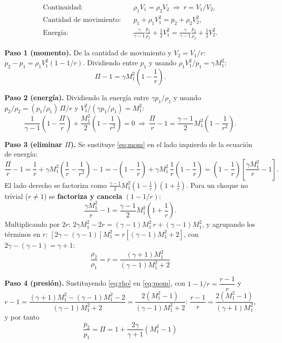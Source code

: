 \documentclass[11pt,a4paper]{article}
\begin{document}
\begin{align}
\text{Continuidad:}&\quad \rho_1V_1=\rho_2V_2\ \Rightarrow\ r=V_1/V_2,\\
\text{Cantidad de movimiento:}&\quad p_1+\rho_1V_1^2=p_2+\rho_2V_2^2,\\
\text{Energía:}&\quad \tfrac{\gamma}{\gamma-1}\tfrac{p_1}{\rho_1}+\tfrac12V_1^2=\tfrac{\gamma}{\gamma-1}\tfrac{p_2}{\rho_2}+\tfrac12V_2^2.
\end{align}

\textbf{Paso 1 (momento).} De la cantidad de movimiento y $V_2=V_1/r$: $p_2-p_1=\rho_1V_1^2(1-1/r)$. Dividiendo entre $p_1$ y usando $\rho_1V_1^2/p_1=\gamma M_1^2$:
\begin{equation}\Pi-1=\gamma M_1^2\left(1-\frac1r\right).\label{eq:mom}\end{equation}

\textbf{Paso 2 (energía).} Dividiendo la energía entre $\gamma p_1/\rho_1$ y usando $p_2/\rho_2=(p_1/\rho_1)\,\Pi/r$ y $V_1^2/(\gamma p_1/\rho_1)=M_1^2$:
\[
\frac{1}{\gamma-1}\left(1-\frac{\Pi}{r}\right)+\frac{M_1^2}{2}\left(1-\frac1{r^2}\right)=0
\ \Longrightarrow\
\frac{\Pi}{r}-1=\frac{\gamma-1}{2}M_1^2\left(1-\frac1{r^2}\right).\label{eq:en}
\]

\textbf{Paso 3 (eliminar $\Pi$).} Se sustituye \eqref{eq:mom} en el lado izquierdo de la ecuación de energía:
\[
\frac{\Pi}{r}-1=\frac1r+\gamma M_1^2\left(\frac1r-\frac1{r^2}\right)-1=-\left(1-\frac1r\right)+\gamma M_1^2\,\frac1r\left(1-\frac1r\right)
=\left(1-\frac1r\right)\left[\frac{\gamma M_1^2}{r}-1\right].
\]
El lado derecho se factoriza como $\tfrac{\gamma-1}{2}M_1^2\left(1-\tfrac1r\right)\left(1+\tfrac1r\right)$. Para un choque no trivial ($r\ne1$) se
\textbf{factoriza y cancela} $(1-1/r)$:
\[
\frac{\gamma M_1^2}{r}-1=\frac{\gamma-1}{2}M_1^2\left(1+\frac1r\right).
\]
Multiplicando por $2r$: $2\gamma M_1^2-2r=(\gamma-1)M_1^2\,r+(\gamma-1)M_1^2$, y agrupando los términos en $r$:
$\left[2\gamma-(\gamma-1)\right]M_1^2=r\left[(\gamma-1)M_1^2+2\right]$, con $2\gamma-(\gamma-1)=\gamma+1$:
\begin{equation}
\boxed{\frac{\rho_2}{\rho_1}=r=\frac{(\gamma+1)M_1^2}{(\gamma-1)M_1^2+2}}\label{eq:rho}
\end{equation}

\textbf{Paso 4 (presión).} Sustituyendo \eqref{eq:rho} en \eqref{eq:mom}, con $1-1/r=\dfrac{r-1}{r}$ y
$r-1=\dfrac{(\gamma+1)M_1^2-(\gamma-1)M_1^2-2}{(\gamma-1)M_1^2+2}=\dfrac{2(M_1^2-1)}{(\gamma-1)M_1^2+2}$:
$\dfrac{r-1}{r}=\dfrac{2(M_1^2-1)}{(\gamma+1)M_1^2}$, y por tanto
\begin{equation}
\boxed{\frac{p_2}{p_1}=\Pi=1+\frac{2\gamma}{\gamma+1}\left(M_1^2-1\right)}\label{eq:pres}
\end{equation}
\end{document}
